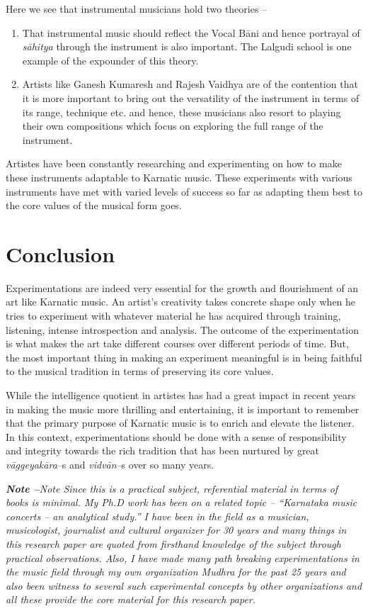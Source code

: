 Here we see that instrumental musicians hold two theories –

\begin{enumerate}
\item That instrumental music should reflect the Vocal Bāni and hence portrayal of \textit{sāhitya} through the instrument is also important. The Lalgudi school is one example of the expounder of this theory.

 \item Artists like Ganesh Kumaresh and Rajesh Vaidhya are of the contention that it is more important to bring out the versatility of the instrument in terms of its range, technique etc. and hence, these musicians also resort to playing their own compositions which focus on exploring the full range of the instrument.

\end{enumerate}

Artistes have been constantly researching and experimenting on how to make these instruments adaptable to Karnatic music. These experiments with various instruments have met with varied levels of success so far as adapting them best to the core values of the musical form goes.


\section*{Conclusion}

Experimentations are indeed very essential for the growth and flourishment of an art like Karnatic music. An artist’s creativity takes concrete shape only when he tries to experiment with whatever material he has acquired through training, listening, intense introspection and analysis. The outcome of the experimentation is what makes the art take different courses over different periods of time. But, the most important thing in making an experiment meaningful is in being faithful to the musical tradition in terms of preserving its core values.

While the intelligence quotient in artistes has had a great impact in recent years in making the music more thrilling and entertaining, it is important to remember that the primary purpose of Karnatic music is to enrich and elevate the listener. In this context, experimentations should be done with a sense of responsibility and integrity towards the rich tradition that has been nurtured by great \textit{vāggeyakāra}–s and \textit{vidvān}–s over so many years.

\textit{\textbf{Note –}Note Since this is a practical subject, referential material in terms of books is minimal. My Ph.D work has been on a related topic – “Karnataka music concerts – an analytical study.” I have been in the field as a musician, musicologist, journalist and cultural organizer for 30 years and many things in this research paper are quoted from firsthand knowledge of the subject through practical observations. Also, I have made many path breaking experimentations in the music field through my own organization Mudhra for the past 25 years and also been witness to several such experimental concepts by other organizations and all these provide the core material for this research paper.}


